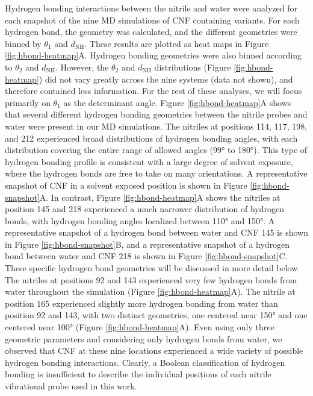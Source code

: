 Hydrogen bonding interactions between the nitrile and water were analyzed for each snapshot of the nine MD simulations of CNF containing variants.
For each hydrogen bond, the geometry was calculated, and the different geometries were binned by $\theta_1$ and $d_{\text{NH}}$.
These results are plotted as heat maps in Figure \ref{fig:hbond-heatmap}A.
Hydrogen bonding geometries were also binned according to $\theta_2$ and $d_{\text{NH}}$.
However, the $\theta_2$ and $d_{\text{NH}}$ distributions (Figure \ref{fig:hbond-heatmap}) did not vary greatly across the nine systems (data not shown), and therefore contained less information.
For the rest of these analyses, we will focus primarily on $\theta_1$ as the determinant angle.
Figure \ref{fig:hbond-heatmap}A shows that several different hydrogen bonding geometries between the nitrile probes and water were present in our MD simulations.
The nitriles at positions 114, 117, 198, and 212 experienced broad distributions of hydrogen bonding angles, with each distribution covering the entire range of allowed angles (\ang{99} to \ang{180}).
This type of hydrogen bonding profile is consistent with a large degree of solvent exposure, where the hydrogen bonds are free to take on many orientations.
A representative snapshot of CNF in a solvent exposed position is shown in Figure \ref{fig:hbond-snapshot}A.
In contrast, Figure \ref{fig:hbond-heatmap}A shows the nitriles at position 145 and 218 experienced a much narrower distribution of hydrogen bonds, with hydrogen bonding angles localized between \ang{110} and \ang{150}.
A representative snapshot of a hydrogen bond between water and CNF 145 is shown in Figure \ref{fig:hbond-snapshot}B, and a representative snapshot of a hydrogen bond between water and CNF 218 is shown in Figure \ref{fig:hbond-snapshot}C.
These specific hydrogen bond geometries will be discussed in more detail below.
The nitriles at positions 92 and 143 experienced very few hydrogen bonds from water throughout the simulation (Figure \ref{fig:hbond-heatmap}A).
The nitrile at position 165 experienced slightly more hydrogen bonding from water than position 92 and 143, with two distinct geometries, one centered near \ang{150} and one centered near \ang{100} (Figure \ref{fig:hbond-heatmap}A).
Even using only three geometric parameters and considering only hydrogen bonds from water, we observed that CNF at these nine locations experienced a wide variety of possible hydrogen bonding interactions.
Clearly, a Boolean classification of hydrogen bonding is insufficient to describe the individual positions of each nitrile vibrational probe used in this work. 

